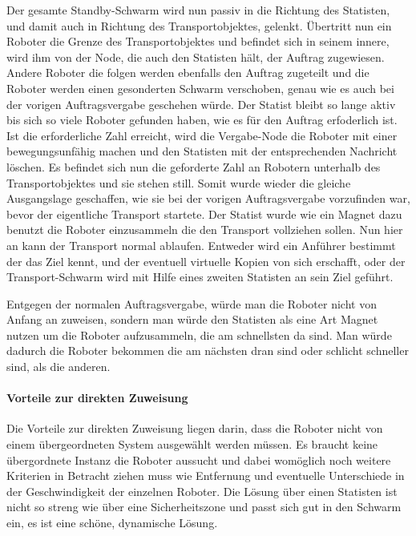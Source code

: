 Der gesamte Standby-Schwarm wird nun passiv in die Richtung des Statisten, und damit auch in Richtung des Transportobjektes, gelenkt. Übertritt nun ein Roboter die Grenze des Transportobjektes und befindet sich in seinem innere, wird ihm von der Node, die auch den Statisten hält, der Auftrag zugewiesen. Andere Roboter die folgen werden ebenfalls den Auftrag zugeteilt und die Roboter werden einen gesonderten Schwarm verschoben, genau wie es auch bei der vorigen Auftragsvergabe geschehen würde. Der Statist bleibt so lange aktiv bis sich so viele Roboter gefunden haben, wie es für den Auftrag erfoderlich ist. Ist die erforderliche Zahl erreicht, wird die Vergabe-Node die Roboter mit einer  bewegungsunfähig machen und den Statisten mit der entsprechenden Nachricht löschen. Es befindet sich nun die geforderte Zahl an Robotern unterhalb des Transportobjektes und sie stehen still. Somit wurde wieder die gleiche Ausgangslage geschaffen, wie sie bei der vorigen Auftragsvergabe vorzufinden war, bevor der eigentliche Transport startete. Der Statist wurde wie ein Magnet dazu benutzt die Roboter einzusammeln die den Transport vollziehen sollen.
Nun hier an kann der Transport normal ablaufen. Entweder wird ein Anführer bestimmt der das Ziel kennt, und der eventuell virtuelle Kopien von sich erschafft, oder der Transport-Schwarm wird mit Hilfe eines zweiten Statisten an sein Ziel geführt.

Entgegen der normalen Auftragsvergabe, würde man die Roboter nicht von Anfang an zuweisen, sondern man würde den Statisten als eine Art Magnet nutzen um die Roboter aufzusammeln, die am schnellsten da sind. Man würde dadurch die Roboter bekommen die am nächsten dran sind oder schlicht schneller sind, als die anderen.

\paragraph*{Vorteile zur direkten Zuweisung}
Die Vorteile zur direkten Zuweisung liegen darin, dass die Roboter nicht von einem übergeordneten System ausgewählt werden müssen. Es braucht keine übergordnete Instanz die Roboter aussucht und dabei womöglich noch weitere Kriterien in Betracht ziehen muss wie Entfernung und eventuelle Unterschiede in der Geschwindigkeit der einzelnen Roboter. Die Lösung über einen Statisten ist nicht so streng wie über eine Sicherheitszone und passt sich gut in den Schwarm ein, es ist eine schöne, dynamische Lösung.

